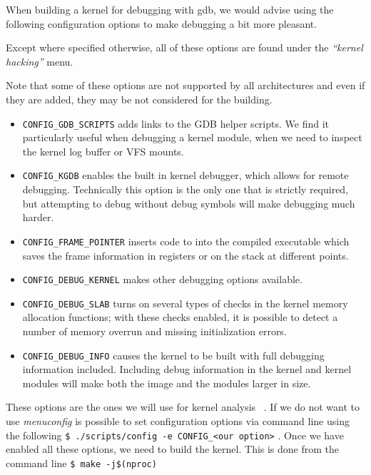 \documentclass{masterthesis}
\begin{document}
When building a kernel for debugging with gdb, we would advise using the following configuration options to make debugging a bit more pleasant. 

Except where specified otherwise, all of these options are found under the \emph{``kernel hacking''} menu.


Note that some of these options are not supported by all architectures and even if they are added, they may be not considered for the building.
\begin{itemize}
\item \texttt{CONFIG\_GDB\_SCRIPTS} adds links to the GDB helper scripts. We find it particularly useful when debugging a kernel module, when we need to inspect the kernel log buffer or VFS mounts.

\item \texttt{CONFIG\_KGDB} enables the built in kernel debugger, which allows for remote debugging. Technically this option is the only one that is strictly required, but attempting to debug without debug symbols will make debugging much harder.

\item \texttt{CONFIG\_FRAME\_POINTER} inserts code to into the compiled executable which saves the frame information in registers or on the stack at different points.

\item \texttt{CONFIG\_DEBUG\_KERNEL} makes other debugging options available.

\item \texttt{CONFIG\_DEBUG\_SLAB} turns on several types of checks in the kernel memory allocation functions; with these checks enabled, it is possible to detect a number of memory overrun and missing initialization errors.

\item \texttt{CONFIG\_DEBUG\_INFO} causes the kernel to be built with full debugging information included. Including debug information in the kernel and kernel modules will make both the image and the modules larger in size.
\end{itemize}
These options are the ones we will use for kernel analysis ~\cite{kernel_analysis}.
If we do not want to use \textit{menuconfig} is possible to set configuration options via command line using the following
\lstinline{$ ./scripts/config -e CONFIG_<our option>} .
Once we have enabled all these options, we need to build the kernel.
This is done from the command line \lstinline{$ make -j$(nproc)}
\end{document}
